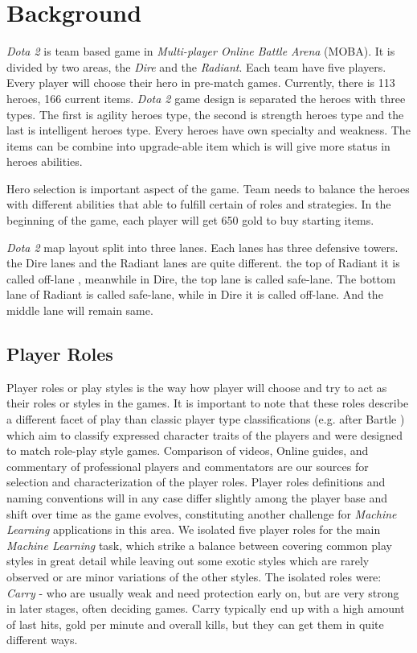 \section{Background}
\label{sec:background}

\textit{Dota 2} is team based game in \textit{Multi-player Online Battle Arena} (MOBA). It is divided by two areas, the \textit{Dire} and the \textit{Radiant}. Each team have five players. Every player will choose their hero in pre-match games. Currently, there is 113 heroes, 166 current items. \textit{Dota 2} game design is separated the heroes with three types. The first is agility heroes type, the second is strength heroes type and the last is intelligent heroes type. Every heroes have own specialty and weakness. The items can be combine into upgrade-able item which is will give more status in heroes abilities.

Hero selection is important aspect of the game. Team needs to balance the heroes with different abilities that able to fulfill certain of roles and strategies. In the beginning of the game, each player will get 650 gold to buy starting items.

\textit{Dota 2} map layout split into three lanes. Each lanes has three defensive towers. the Dire lanes and the Radiant lanes are quite different. the top of Radiant it is called off-lane , meanwhile in Dire, the top lane is called safe-lane. The bottom lane of Radiant is called safe-lane, while in Dire it is called off-lane. And the middle lane will remain same.

\subsection{Player Roles}
\label{sec:player_roles}

Player roles or play styles is the way how player will choose and try to act as their roles or styles in the games. It is important to note that these roles describe a different facet of play than classic player type classifications (e.g. after Bartle \cite{bartle1996hearts}) which aim to classify expressed character traits of the players and were designed to match role-play style games. Comparison of videos, Online guides, and commentary of professional players and commentators are our sources for selection and characterization of the player roles. Player roles definitions and naming conventions will in any case differ slightly among the player base and shift over time as the game evolves, constituting another challenge for \textit{Machine Learning} applications in this area. We isolated five player roles for the main \textit{Machine Learning} task, which strike a balance between covering common play styles in great detail while leaving out some exotic styles which are rarely observed or are minor variations of the other styles. The isolated roles were: \textit{Carry} - who are usually weak and need protection early on, but are very strong in later stages, often deciding games. Carry typically end up with a high amount of last hits, gold per minute and overall kills, but they can get them in quite different ways.
